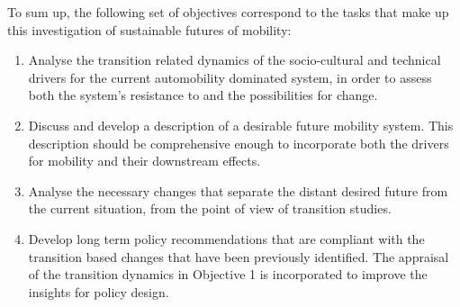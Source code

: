 To sum up, the following set of objectives correspond to the tasks that make up this investigation of sustainable futures of mobility:
\begin{enumerate}[leftmargin=*,label=\textbf{Obj.~\arabic*.}]
\item\label{obj:1} Analyse the transition related dynamics of the socio-cultural and technical drivers for the current automobility dominated system, in order to assess both the system's resistance to and the possibilities for change.
\item Discuss and develop a description of a desirable future mobility system. This description should be comprehensive enough to incorporate both the drivers for mobility and their downstream effects.
\item Analyse the necessary changes that separate the distant desired future from the current situation, from the point of view of transition studies.
\item Develop long term policy recommendations that are compliant with the transition based changes that have been previously identified. The appraisal of the transition dynamics in Objective 1 is incorporated to improve the insights for policy design.
\end{enumerate}